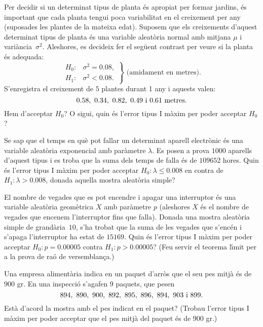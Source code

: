 \begin{prob}
{Per decidir si un determinat tipus de planta \'es apropiat per formar
jardins, \'es important que cada planta tengui 
poca variabilitat en el creixement
per any (suposades les plantes de la mateixa edat). Suposem que els creixements
d'aquest determinat tipus de planta \'es una variable 
aleat\`oria normal amb mitjana $\mu$ i
vari\`ancia~$\sigma^2$. Aleshores, es decideix fer 
el seg\"uent contrast per veure si
la planta \'es adequada:
$$\left.
\begin{array}{ll}
H_0 :& \sigma^2 =0.08,\\ H_1 :& \sigma^2 <0.08.
\end{array}
\right\}
\mbox{ (amidament en metres).}$$
S'enregistra el creixement de $5$ plantes durant 1 any i aquests valen: 
$$0.58,\ 0.34,\ 0.82,\ 0.49\hbox{ i } 0.61\hbox{ metres.}$$
Hem d'acceptar $H_0$? O sigui, quin \'es l'error tipus I m\`axim per
poder acceptar $H_0$?}
\end{prob}

\begin{prob}
{Se sap que el temps en qu\`e pot fallar un determinat aparell
electr\`onic \'es una variable aleat\`oria exponencial 
amb par\`ametre $\lambda$. Es posen a prova
$1000$ aparells d'aquest tipus i es troba que la 
suma dels temps de falla \'es de
$109652$ hores. Quin \'es l'error tipus I m\`axim 
per poder acceptar $H_0:\lambda \leq 0.008$ en
contra de $H_1:\lambda >0.008$, donada aquella mostra aleat\`oria simple?} 
\end{prob}

\begin{prob}
{El nombre de
vegades que es pot encendre i apagar una interruptor \'es una variable aleat\`oria geom\`etrica $X$
amb par\`ametre $p$ (aleshores $X$ \'es el nombre de vegades que encenem 
l'interruptor fins
que falla). Donada una mostra aleat\`oria simple de grand\`aria~$10$, s'ha trobat que la suma de les
vegades que s'enc\'en i s'apaga l'interruptor ha estat de $15169$. 
Quin \'es l'error tipus I m\`axim per poder acceptar
$H_0:p=0.00005$ contra $H_1:p>0.00005$? {\footnotesize (Feu servir
el teorema l\'{\i}mit per a la prova de ra\'o de versemblan\c{c}a.)}}
\end{prob}

\begin{prob}
{Una empresa aliment\`aria indica en un paquet d'arr\`os que el seu pes mitj\`a
\'es de $900$ gr. En una inspecci\'o s'agafen $9$ paquets, que pesen
$$894,\ 890,\ 900,\ 892,\ 895,\ 896,\ 894,\ 903\hbox{ i }899.$$Est\`a d'acord la
mostra amb el pes indicat en el paquet? (Trobau l'error tipus I
m\`axim per poder acceptar que el pes mitj\`a del paquet \'es de $900$ gr.)
}
\end{prob}

